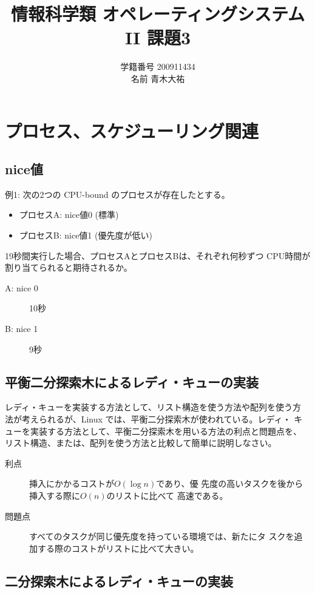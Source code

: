\documentclass[a4j,9pt]{jsarticle}
\title{情報科学類 オペレーティングシステムII 課題3}
\author{学籍番号 200911434 \\ 名前 青木大祐}
\begin{document}
\maketitle
\setcounter{section}{2}
\section{プロセス、スケジューリング関連}
\setcounter{subsection}{300}
\subsection{nice値}
\begin{screen}
例1: 次の2つの CPU-bound のプロセスが存在したとする。
\begin{itemize}
 \item プロセスA: nice値0 (標準)
 \item プロセスB: nice値1 (優先度が低い)
\end{itemize}
19秒間実行した場合、プロセスAとプロセスBは、それぞれ何秒ずつ CPU時間が割り当てられると期待されるか。
\end{screen}

\begin{description}
 \item[A: nice 0] 10秒
 \item[B: nice 1] 9秒
\end{description}

\subsection{平衡二分探索木によるレディ・キューの実装}
\begin{screen}
レディ・キューを実装する方法として、リスト構造を使う方法や配列を使う方
 法が考えられるが、Linux では、平衡二分探索木が使われている。レディ・
 キューを実装する方法として、平衡二分探索木を用いる方法の利点と問題点を、
 リスト構造、または、配列を使う方法と比較して簡単に説明しなさい。
\end{screen}

\begin{description}
 \item[利点] 挿入にかかるコストが$O(\log n)$であり、優
            先度の高いタスクを後から挿入する際に$O(n)$のリストに比べて
            高速である。
 \item[問題点] すべてのタスクが同じ優先度を持っている環境では、新たにタ
            スクを追加する際のコストがリストに比べて大きい。
\end{description}
\subsection{二分探索木によるレディ・キューの実装}
\end{document}
